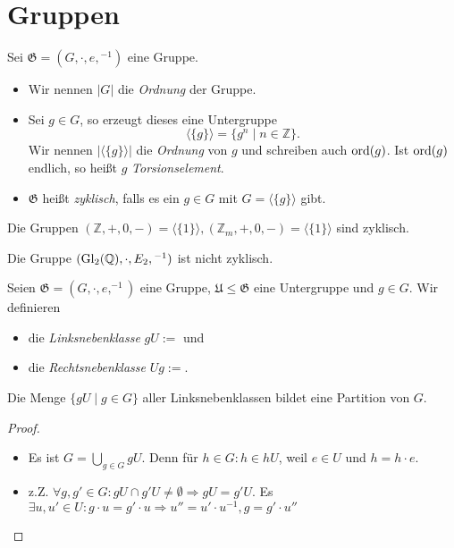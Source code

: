 \section{Gruppen}

\begin{definition}
    Sei $\mathfrak{G} = (G, \cdot, e, {}^{-1})$ eine Gruppe.
    \begin{itemize}
        \item Wir nennen $|G|$ die \emph{Ordnung} der Gruppe.
        \item Sei $g \in G$, so erzeugt dieses eine Untergruppe
        $$ \langle \{ g \} \rangle = \{ g^n \mid n \in \mathbb{Z} \}. $$
        Wir nennen $|\langle\{g\}\rangle|$ die \emph{Ordnung} von $g$ und schreiben auch $\operatorname{ord}(g)$. Ist $\operatorname{ord}(g)$ endlich, so heißt $g$ \emph{Torsionselement}.
        \item $\mathfrak{G}$ heißt \emph{zyklisch}, falls es ein $g \in G$ mit $G = \langle\{g\}\rangle$ gibt.
    \end{itemize}
\end{definition}

\begin{example}
    
\end{example}

\begin{example}
    Die Gruppen $(\mathbb{Z}, +, 0, -) = \langle\{1\}\rangle, (\mathbb{Z}_m, +, 0, -) = \langle\{1\}\rangle$ sind zyklisch.

    Die Gruppe $(\operatorname{Gl}_2(\mathbb{Q}), \cdot, E_2, {}^{-1})$ ist nicht zyklisch.
\end{example}

\begin{definition}
    Seien $\mathfrak{G} = (G, \cdot, e, ^{-1})$ eine Gruppe, $\mathfrak{U} \le \mathfrak{G}$ eine Untergruppe und $g \in G$. Wir definieren 
    \begin{itemize}[topsep=0cm, label={--}]
        \item die \emph{Linksnebenklasse} $gU := {}$ und
        \item die \emph{Rechtsnebenklasse} $Ug := {}$. %
    \end{itemize}
\end{definition}

\begin{lemma}
    Die Menge $\{gU \mid g \in G\}$ aller Linksnebenklassen bildet eine Partition von $G$.
\end{lemma}
\begin{proof}\phantom{.}
    \begin{itemize}
        \item Es ist $G = \bigcup_{g \in G} gU$. Denn für $h \in G: h \in hU$, weil $e \in U$ und $h = h \cdot e$.
        \item z.Z. $\forall g, g' \in G: gU \cap g'U \not= \emptyset \Rightarrow gU = g'U$. Es $\exists u, u' \in U: g\cdot u = g'\cdot u \Rightarrow u'' = u' \cdot u^{-1}, g = g' \cdot u''$ 
    \end{itemize}
    
\end{proof}

